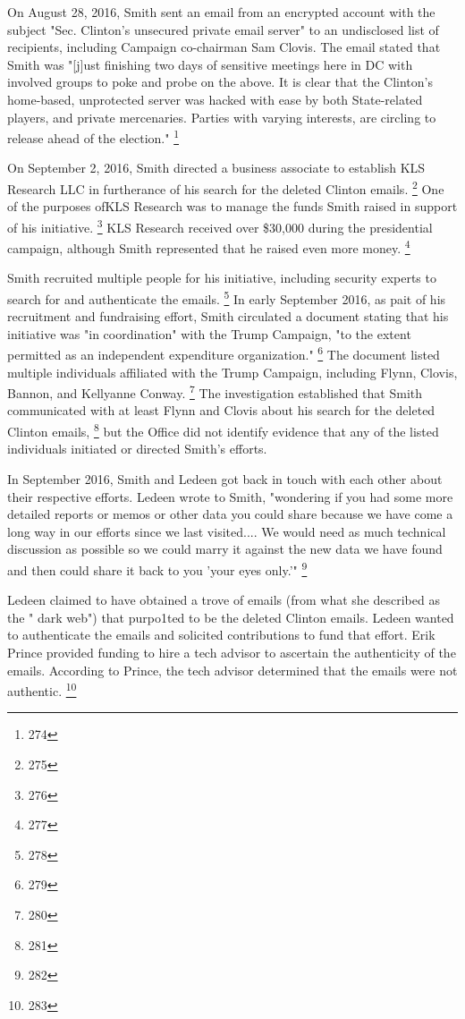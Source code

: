 On August 28, 2016, Smith sent an email from an encrypted account with the subject "Sec. Clinton's unsecured private email server" to an undisclosed list of recipients, including Campaign co-chairman Sam Clovis.
The email stated that Smith was "[j]ust finishing two days of sensitive meetings here in DC with involved groups to poke and probe on the above.
It is clear that the Clinton's home-based, unprotected server was hacked with ease by both State-related players, and private mercenaries.
Parties with varying interests, are circling to release ahead of the election."%
\footnote{274}

On September 2, 2016, Smith directed a business associate to establish KLS Research LLC in furtherance of his search for the deleted Clinton emails.%
\footnote{275}
One of the purposes ofKLS Research was to manage the funds Smith raised in support of his initiative.%
\footnote{276}
KLS Research received over \$30,000 during the presidential campaign, although Smith represented that he raised even more money.%
\footnote{277}

Smith recruited multiple people for his initiative, including security experts to search for and authenticate the emails.%
\footnote{278}
In early September 2016, as pait of his recruitment and fundraising effort, Smith circulated a document stating that his initiative was "in coordination" with the Trump Campaign, "to the extent permitted as an independent expenditure organization."%
\footnote{279}
The document listed multiple individuals affiliated with the Trump Campaign, including Flynn, Clovis, Bannon,
and Kellyanne Conway.%
\footnote{280}
The investigation established that Smith communicated with at least Flynn and Clovis about his search for the deleted Clinton emails,%
\footnote{281}
but the Office did not identify evidence that any of the listed individuals initiated or directed Smith's efforts.

In September 2016, Smith and Ledeen got back in touch with each other about their respective efforts.
Ledeen wrote to Smith, "wondering if you had some more detailed reports or memos or other data you could share because we have come a long way in our efforts since we last visited....
We would need as much technical discussion as possible so we could marry it against the new data we have found and then could share it back to you 'your eyes only.'"%
\footnote{282}

Ledeen claimed to have obtained a trove of emails (from what she described as the " dark web") that purpo1ted to be the deleted Clinton emails.
Ledeen wanted to authenticate the emails and solicited contributions to fund that effort.
Erik Prince provided funding to hire a tech advisor to ascertain the authenticity of the emails.
According to Prince, the tech advisor determined that the emails were not authentic.%
\footnote{283}

